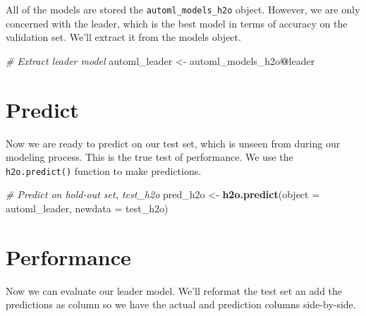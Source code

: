 \documentclass[]{book}
\newenvironment{Shaded}{\begin{snugshade}}{\end{snugshade}}
\newcommand{\CommentTok}[1]{\textcolor[rgb]{0.56,0.35,0.01}{\textit{#1}}}
\newcommand{\DataTypeTok}[1]{\textcolor[rgb]{0.13,0.29,0.53}{#1}}
\newcommand{\KeywordTok}[1]{\textcolor[rgb]{0.13,0.29,0.53}{\textbf{#1}}}
\newcommand{\NormalTok}[1]{#1}
\newcommand{\OperatorTok}[1]{\textcolor[rgb]{0.81,0.36,0.00}{\textbf{#1}}}
\newcommand{\StringTok}[1]{\textcolor[rgb]{0.31,0.60,0.02}{#1}}
\begin{document}
All of the models are stored the \texttt{automl\_models\_h2o} object. However, we are only concerned with the leader, which is the best model in terms of accuracy on the validation set. We'll extract it from the models object.

\begin{Shaded}
\begin{Highlighting}[]
\CommentTok{# Extract leader model}
\NormalTok{automl_leader <-}\StringTok{ }\NormalTok{automl_models_h2o}\OperatorTok{@}\NormalTok{leader}
\end{Highlighting}
\end{Shaded}

\hypertarget{predict}{%
\section{Predict}\label{predict}}

Now we are ready to predict on our test set, which is unseen from during our modeling process. This is the true test of performance. We use the \texttt{h2o.predict()} function to make predictions.\\

\begin{Shaded}
\begin{Highlighting}[]
\CommentTok{# Predict on hold-out set, test_h2o}
\NormalTok{pred_h2o <-}\StringTok{ }\KeywordTok{h2o.predict}\NormalTok{(}\DataTypeTok{object =}\NormalTok{ automl_leader, }\DataTypeTok{newdata =}\NormalTok{ test_h2o)}
\end{Highlighting}
\end{Shaded}

\hypertarget{performance}{%
\section{Performance}\label{performance}}

Now we can evaluate our leader model. We'll reformat the test set an add the predictions as column so we have the actual and prediction columns side-by-side.\\
\end{document}
